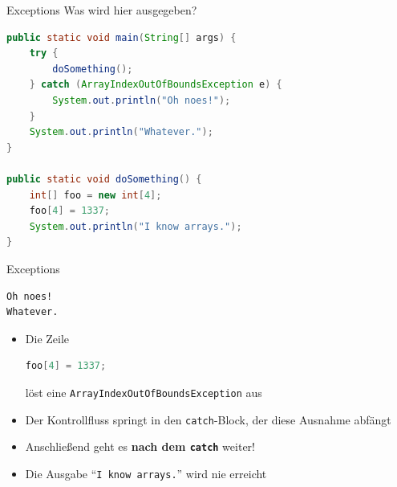 \documentclass[18pt]{beamer}
\newcommand{\quotes}[1]{``#1''}
\begin{document}
\begin{frame}[fragile]{Exceptions}
    Was wird hier ausgegeben?
    \begin{exampleblock}{}
        \begin{lstlisting}[language=Java,basicstyle=\scriptsize]
public static void main(String[] args) {
    try {
        doSomething();
    } catch (ArrayIndexOutOfBoundsException e) {
        System.out.println("Oh noes!");
    }
    System.out.println("Whatever.");
}

public static void doSomething() {
    int[] foo = new int[4];
    foo[4] = 1337;
    System.out.println("I know arrays.");
}
        \end{lstlisting}

    \end{exampleblock}

\end{frame}

\begin{frame}[fragile]{Exceptions}
    \begin{exampleblock}{}
        \begin{lstlisting}
Oh noes!
Whatever.
        \end{lstlisting}

    \end{exampleblock}

    \pause

    \begin{itemize}
        \item Die Zeile \begin{lstlisting}[language=Java,basicstyle=\scriptsize]
foo[4] = 1337;
        \end{lstlisting}
        löst eine \texttt{ArrayIndexOutOfBoundsException} aus
        \item Der Kontrollfluss springt in den \texttt{catch}-Block, der diese Ausnahme abfängt
        \item Anschließend geht es \textbf{\alert{nach dem \texttt{catch}}} weiter!
        \item Die Ausgabe \quotes{\texttt{I know arrays.}} wird nie erreicht

    \end{itemize}

\end{frame}
\end{document}
